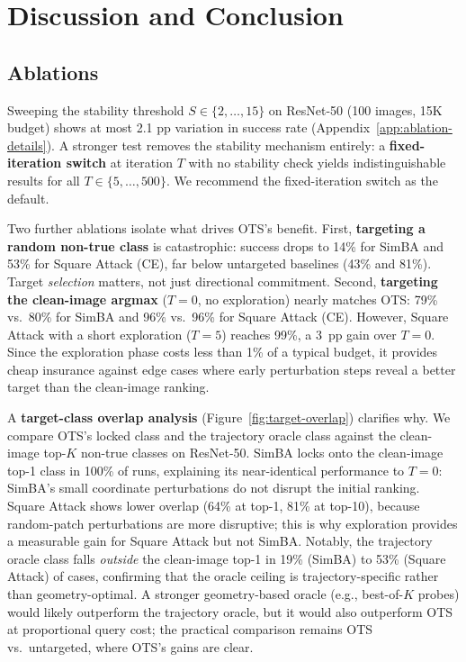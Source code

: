 \documentclass{cap2026}
\begin{document}
\section{Discussion and Conclusion}\label{sec:conclusion}

\subsection{Ablations}\label{sec:ablations}
Sweeping the stability threshold $S \in \{2, \ldots, 15\}$ on ResNet-50 (100 images, 15K budget) shows at most 2.1 pp variation in success rate (Appendix~\ref{app:ablation-details}). A stronger test removes the stability mechanism entirely: a \textbf{fixed-iteration switch} at iteration $T$ with no stability check yields indistinguishable results for all $T \in \{5, \ldots, 500\}$. We recommend the fixed-iteration switch as the default.

Two further ablations isolate what drives OTS's benefit. First, \textbf{targeting a random non-true class} is catastrophic: success drops to 14\% for SimBA and 53\% for Square Attack (CE), far below untargeted baselines (43\% and 81\%). Target \emph{selection} matters, not just directional commitment. Second, \textbf{targeting the clean-image argmax} ($T = 0$, no exploration) nearly matches OTS: 79\% vs.\ 80\% for SimBA and 96\% vs.\ 96\% for Square Attack (CE). However, Square Attack with a short exploration ($T = 5$) reaches 99\%, a 3~pp gain over $T = 0$. Since the exploration phase costs less than 1\% of a typical budget, it provides cheap insurance against edge cases where early perturbation steps reveal a better target than the clean-image ranking.

A \textbf{target-class overlap analysis} (Figure~\ref{fig:target-overlap}) clarifies why. We compare OTS's locked class and the trajectory oracle class against the clean-image top-$K$ non-true classes on ResNet-50. SimBA locks onto the clean-image top-1 class in 100\% of runs, explaining its near-identical performance to $T = 0$: SimBA's small coordinate perturbations do not disrupt the initial ranking. Square Attack shows lower overlap (64\% at top-1, 81\% at top-10), because random-patch perturbations are more disruptive; this is why exploration provides a measurable gain for Square Attack but not SimBA. Notably, the trajectory oracle class falls \emph{outside} the clean-image top-1 in 19\% (SimBA) to 53\% (Square Attack) of cases, confirming that the oracle ceiling is trajectory-specific rather than geometry-optimal. A stronger geometry-based oracle (e.g., best-of-$K$ probes) would likely outperform the trajectory oracle, but it would also outperform OTS at proportional query cost; the practical comparison remains OTS vs.\ untargeted, where OTS's gains are clear.
\end{document}
